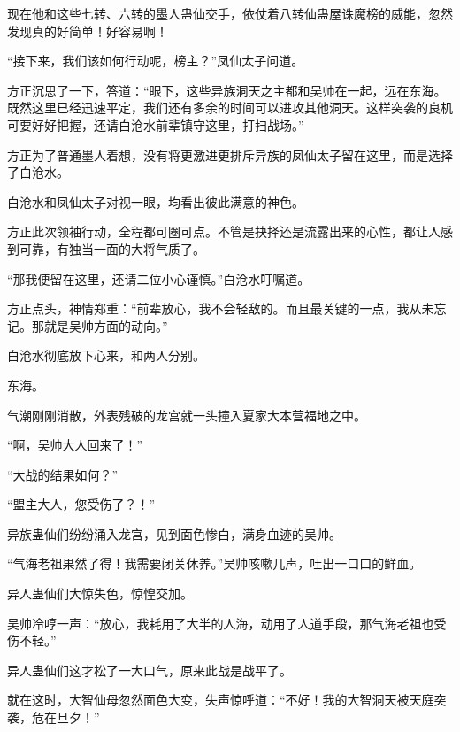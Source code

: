 \begin{this_body}
现在他和这些七转、六转的墨人蛊仙交手，依仗着八转仙蛊屋诛魔榜的威能，忽然发现真的好简单！好容易啊！

“接下来，我们该如何行动呢，榜主？”凤仙太子问道。

方正沉思了一下，答道：“眼下，这些异族洞天之主都和吴帅在一起，远在东海。既然这里已经迅速平定，我们还有多余的时间可以进攻其他洞天。这样突袭的良机可要好好把握，还请白沧水前辈镇守这里，打扫战场。”

方正为了普通墨人着想，没有将更激进更排斥异族的凤仙太子留在这里，而是选择了白沧水。

白沧水和凤仙太子对视一眼，均看出彼此满意的神色。

方正此次领袖行动，全程都可圈可点。不管是抉择还是流露出来的心性，都让人感到可靠，有独当一面的大将气质了。

“那我便留在这里，还请二位小心谨慎。”白沧水叮嘱道。

方正点头，神情郑重：“前辈放心，我不会轻敌的。而且最关键的一点，我从未忘记。那就是吴帅方面的动向。”

白沧水彻底放下心来，和两人分别。

东海。

气潮刚刚消散，外表残破的龙宫就一头撞入夏家大本营福地之中。

“啊，吴帅大人回来了！”

“大战的结果如何？”

“盟主大人，您受伤了？！”

异族蛊仙们纷纷涌入龙宫，见到面色惨白，满身血迹的吴帅。

“气海老祖果然了得！我需要闭关休养。”吴帅咳嗽几声，吐出一口口的鲜血。

异人蛊仙们大惊失色，惊惶交加。

吴帅冷哼一声：“放心，我耗用了大半的人海，动用了人道手段，那气海老祖也受伤不轻。”

异人蛊仙们这才松了一大口气，原来此战是战平了。

就在这时，大智仙母忽然面色大变，失声惊呼道：“不好！我的大智洞天被天庭突袭，危在旦夕！”

\end{this_body}

